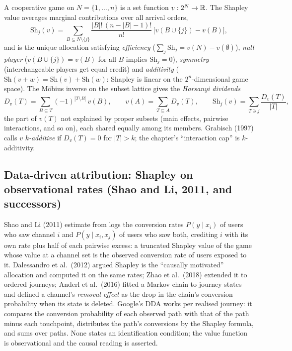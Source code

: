 A cooperative game on $N = \{1, \ldots, n\}$ is a set function $v: 2^N \to \mathbb{R}$. The Shapley value averages marginal contributions over all arrival orders,
\begin{equation}
\mathrm{Sh}_j(v) = \sum_{B \subseteq N \setminus \{j\}} \frac{|B|!\,(n - |B| - 1)!}{n!}\,\big[v(B \cup \{j\}) - v(B)\big],
\label{eq:attr:shapley}
\end{equation}
and is the unique allocation satisfying \emph{efficiency} ($\sum_j \mathrm{Sh}_j = v(N) - v(\emptyset)$), \emph{null player} ($v(B \cup \{j\}) = v(B)$ for all $B$ implies $\mathrm{Sh}_j = 0$), \emph{symmetry} (interchangeable players get equal credit) and \emph{additivity} ($\mathrm{Sh}(v + w) = \mathrm{Sh}(v) + \mathrm{Sh}(w)$: Shapley is linear on the $2^n$-dimensional game space). The M\"obius inverse on the subset lattice gives the \emph{Harsanyi dividends}
\begin{equation}
D_v(T) = \sum_{B \subseteq T} (-1)^{|T \setminus B|}\, v(B), \qquad v(A) = \sum_{T \subseteq A} D_v(T), \qquad \mathrm{Sh}_j(v) = \sum_{T \ni j} \frac{D_v(T)}{|T|},
\label{eq:attr:mobius}
\end{equation}
the part of $v(T)$ not explained by proper subsets (main effects, pairwise interactions, and so on), each shared equally among its members. Grabisch (1997) calls $v$ \emph{$k$-additive} if $D_v(T) = 0$ for $|T| > k$; the chapter's ``interaction cap'' is $k$-additivity.

\subsection{Data-driven attribution: Shapley on observational rates (Shao and Li, 2011, and successors)}

Shao and Li (2011) estimate from logs the conversion rates $P(y \mid x_i)$ of users who saw channel $i$ and $P(y \mid x_i, x_j)$ of users who saw both, crediting $i$ with its own rate plus half of each pairwise excess: a truncated Shapley value of the game whose value at a channel set is the observed conversion rate of users exposed to it. Dalessandro et al.\ (2012) argued Shapley is the ``causally motivated'' allocation and computed it on the same rates; Zhao et al.\ (2018) extended it to ordered journeys; Anderl et al.\ (2016) fitted a Markov chain to journey states and defined a channel's \emph{removal effect} as the drop in the chain's conversion probability when its state is deleted. Google's DDA works per realised journey: it compares the conversion probability of each observed path with that of the path minus each touchpoint, distributes the path's conversions by the Shapley formula, and sums over paths. None states an identification condition; the value function is observational and the causal reading is asserted.

